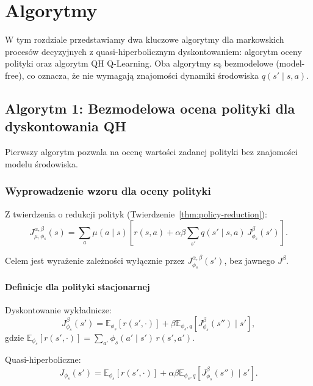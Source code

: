 \chapter{Algorytmy}

W tym rozdziale przedstawiamy dwa kluczowe algorytmy dla markowskich procesów decyzyjnych z quasi-hiperbolicznym dyskontowaniem: algorytm oceny polityki oraz algorytm QH Q-Learning. Oba algorytmy są bezmodelowe (model-free), co oznacza, że nie wymagają znajomości dynamiki środowiska $q(s' \mid s, a)$.

\section{Algorytm 1: Bezmodelowa ocena polityki dla dyskontowania QH}

Pierwszy algorytm pozwala na ocenę wartości zadanej polityki bez znajomości modelu środowiska.

\subsection{Wyprowadzenie wzoru dla oceny polityki}

Z twierdzenia o redukcji polityk (Twierdzenie~\ref{thm:policy-reduction}):
\begin{equation}
J^{\alpha, \beta}_{\mu, \phi_s}(s) = \sum_a \mu(a\mid s) \left[ r(s, a) + \alpha\beta \sum_{s'} q(s'\mid s, a) \, J^{\beta}_{\phi_s}(s') \right].
\label{eq:policy-eval-start}
\end{equation}

Celem jest wyrażenie zależności wyłącznie przez $J^{\alpha, \beta}_{\phi_s}(s')$, bez jawnego $J^{\beta}$.

\subsubsection{Definicje dla polityki stacjonarnej}

Dyskontowanie wykładnicze:
\begin{equation}
J^{\beta}_{\phi_s}(s') = \mathbb{E}_{\phi_s} [r(s', \cdot)] + \beta \mathbb{E}_{\phi_s, q} [J^{\beta}_{\phi_s}(s'') \mid s'],
\label{eq:exp-value}
\end{equation}
gdzie $\mathbb{E}_{\phi_s} [r(s', \cdot)] = \sum_{a'} \phi_s(a'\mid s') \, r(s', a')$.

Quasi-hiperboliczne:
\begin{equation}
J_{\phi_s}(s') = \mathbb{E}_{\phi_s} [r(s', \cdot)] + \alpha \beta \mathbb{E}_{\phi_s, q} [J^{\beta}_{\phi_s}(s'') \mid s'].
\label{eq:qh-value-stat}
\end{equation}

